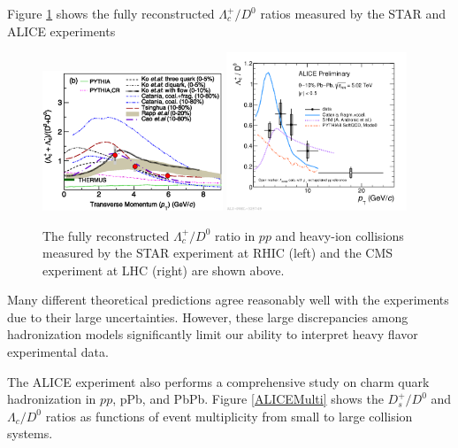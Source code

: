 Figure \ref{HadroPlotCharm} shows the fully reconstructed $\Lambda_c^+/D^0$ ratios measured by the STAR \cite{STARLambdaCD0} and ALICE \cite{ALICELambdaCD0} experiments



\begin{figure}[hbtp]
\begin{center}
\includegraphics[width=0.48\textwidth]{Figures/Chapter2/STARLambdaCD0.png}
\includegraphics[width=0.48\textwidth]{Figures/Chapter2/ALICELambdaCD0}
\caption{The fully reconstructed $\Lambda_c^+/D^0$ ratio in $pp$ and heavy-ion collisions measured by the STAR experiment at RHIC (left) and the CMS experiment at LHC (right) are shown above.}
\label{HadroPlotCharm}
\end{center}
\end{figure}   



Many different theoretical predictions agree reasonably well with the experiments due to their large uncertainties. However, these large discrepancies among hadronization models significantly limit our ability to interpret heavy flavor experimental data. 

The ALICE experiment also performs a comprehensive study on charm quark hadronization in $pp$, pPb, and PbPb. Figure \ref{ALICEMulti} shows the $D^+_s/D^0$ and $\Lambda_c/D^0$ ratios as functions of event multiplicity from small to large collision systems. 

